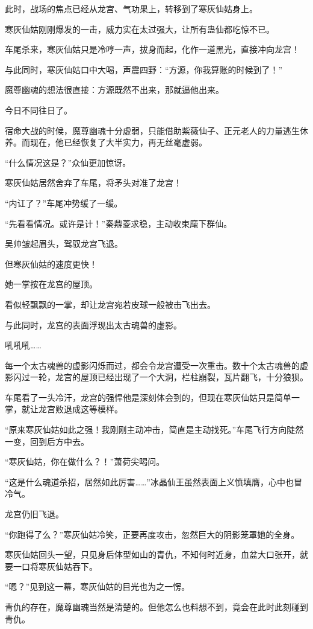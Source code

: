 \begin{this_body}
此时，战场的焦点已经从龙宫、气功果上，转移到了寒灰仙姑身上。

寒灰仙姑刚刚爆发的一击，威力实在太过强大，让所有蛊仙都吃惊不已。

车尾杀来，寒灰仙姑只是冷哼一声，拔身而起，化作一道黑光，直接冲向龙宫！

与此同时，寒灰仙姑口中大喝，声震四野：“方源，你我算账的时候到了！”

魔尊幽魂的想法很直接：方源既然不出来，那就逼他出来。

今日不同往日了。

宿命大战的时候，魔尊幽魂十分虚弱，只能借助紫薇仙子、正元老人的力量逃生休养。而现在，他已经恢复了大半实力，再无丝毫虚弱。

“什么情况这是？”众仙更加惊讶。

寒灰仙姑居然舍弃了车尾，将矛头对准了龙宫！

“内讧了？”车尾冲势缓了一缓。

“先看看情况。或许是计！”秦鼎菱求稳，主动收束麾下群仙。

吴帅皱起眉头，驾驭龙宫飞退。

但寒灰仙姑的速度更快！

她一掌按在龙宫的屋顶。

看似轻飘飘的一掌，却让龙宫宛若皮球一般被击飞出去。

与此同时，龙宫的表面浮现出太古魂兽的虚影。

吼吼吼……

每一个太古魂兽的虚影闪烁而过，都会令龙宫遭受一次重击。数十个太古魂兽的虚影闪过一轮，龙宫的屋顶已经出现了一个大洞，栏柱崩裂，瓦片翻飞，十分狼狈。

车尾看了一头冷汗，龙宫的强悍他是深刻体会到的，但现在寒灰仙姑只是简单一掌，就让龙宫败退成这等模样。

“原来寒灰仙姑如此之强！我刚刚主动冲击，简直是主动找死。”车尾飞行方向陡然一变，回到后方中去。

“寒灰仙姑，你在做什么？！”萧荷尖喝问。

“这是什么魂道杀招，居然如此厉害……”冰晶仙王虽然表面上义愤填膺，心中也冒冷气。

龙宫仍旧飞退。

“你跑得了么？”寒灰仙姑冷笑，正要再度攻击，忽然巨大的阴影笼罩她的全身。

寒灰仙姑回头一望，只见身后体型如山的青仇，不知何时近身，血盆大口张开，就要一口将寒灰仙姑吞下。

“嗯？”见到这一幕，寒灰仙姑的目光也为之一愣。

青仇的存在，魔尊幽魂当然是清楚的。但他怎么也料想不到，竟会在此时此刻碰到青仇。


\end{this_body}
